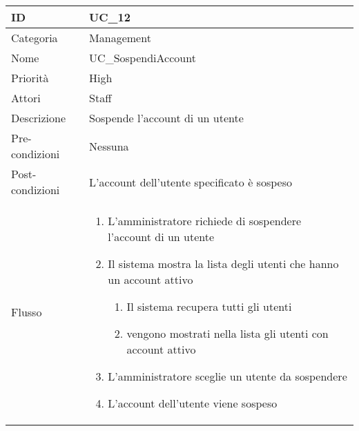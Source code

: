 \begin{center}
\begin{tabular}{ |p{2cm}|p{13.5cm}|  }
\hline
ID & UC\_12 \\\hline
Categoria & Management\\\hline
Nome & UC\_SospendiAccount\\\hline
Priorità & High \\\hline
Attori &  Staff \\\hline
Descrizione & Sospende l'account di un utente\\\hline
Pre-condizioni &  Nessuna\\\hline
Post-condizioni &  L'account dell'utente specificato è sospeso\\\hline
Flusso &  	
		\begin{enumerate}
		\item L'amministratore richiede di sospendere l'account di un utente
		\item Il sistema mostra la lista degli utenti che hanno un account attivo
			\begin{enumerate}[  ]
			\item Il sistema recupera tutti gli utenti
			\item vengono mostrati nella lista gli utenti con account attivo
			\end{enumerate}	
		\item L'amministratore sceglie un utente da sospendere
		\item L'account dell'utente viene sospeso
		\end{enumerate}\\\hline
\end{tabular}
\label{table_use_case:12}\newline



\end{center}

